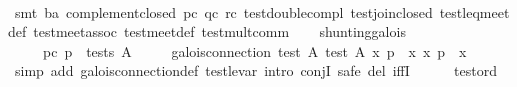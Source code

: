 \begin{isabellebody}
\ \ \ \ \isamarkupfalse%
\ {}smt\ ba{}{}\ complement{}closed\ pc\ qc\ rc\ test{}double{}compl\ test{}join{}closed\ test{}leq{}meet{}def\ test{}meet{}assoc\ test{}meet{}def\ test{}mult{}comm{}%
\endisatagproof
{\isafoldproof}%
%
\isadelimproof
\isanewline
%
\endisadelimproof
\isanewline
\ \ \isamarkupfalse%
\ shunting{}galois{}\isanewline
\ \ \ \ \ pc{}\ {}p\ {}\ tests\ A{}\isanewline
\ \ \ \ \ {}galois{}connection\ {}test\ A{}\ {}test\ A{}\ {}{}x{}\ p\ {}\ x{}\ {}{}x{}\ {}p\ {}\ x{}{}\isanewline
%
\isadelimproof
\ \ %
\endisadelimproof
%
\isatagproof
{}\isamarkupfalse%
\ {}simp\ add{}\ galois{}connection{}def\ test{}le{}var{}\ intro\ conjI{}\ safe\ del{}\ iffI{}\isanewline
\ \ \ \ \isamarkupfalse%
\ test{}ord\ \isamarkupfalse%

\end{isabellebody}
